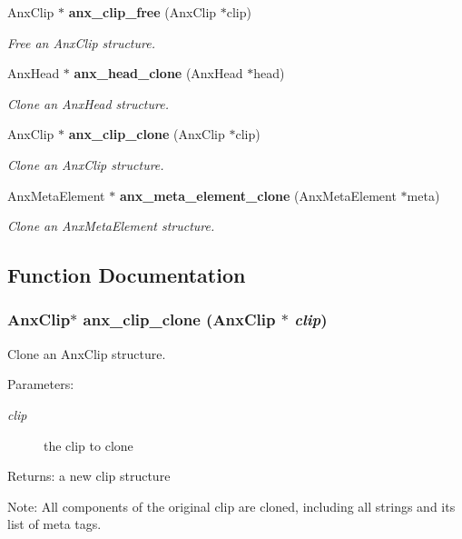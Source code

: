 \begin{CompactItemize}
Anx\-Clip $\ast$ {\bf anx\_\-clip\_\-free} (Anx\-Clip $\ast$clip)
\begin{CompactList}\small\item\em Free an Anx\-Clip structure. \item\end{CompactList}\item 
Anx\-Head $\ast$ {\bf anx\_\-head\_\-clone} (Anx\-Head $\ast$head)
\begin{CompactList}\small\item\em Clone an Anx\-Head structure. \item\end{CompactList}\item 
Anx\-Clip $\ast$ {\bf anx\_\-clip\_\-clone} (Anx\-Clip $\ast$clip)
\begin{CompactList}\small\item\em Clone an Anx\-Clip structure. \item\end{CompactList}\item 
Anx\-Meta\-Element $\ast$ {\bf anx\_\-meta\_\-element\_\-clone} (Anx\-Meta\-Element $\ast$meta)
\begin{CompactList}\small\item\em Clone an Anx\-Meta\-Element structure. \item\end{CompactList}\end{CompactItemize}


\subsection{Function Documentation}
\subsubsection{\setlength{\rightskip}{0pt plus 5cm}Anx\-Clip$\ast$ anx\_\-clip\_\-clone (Anx\-Clip $\ast$ {\em clip})}\label{anx__general_8h_a24}


Clone an Anx\-Clip structure. 

\begin{Desc}
\item[Parameters:]
\begin{description}
\item[{\em clip}]the clip to clone \end{description}
\end{Desc}
\begin{Desc}
\item[Returns:]a new clip structure \end{Desc}
\begin{Desc}
\item[Note:]All components of the original clip are cloned, including all strings and its list of meta tags. \end{Desc}
